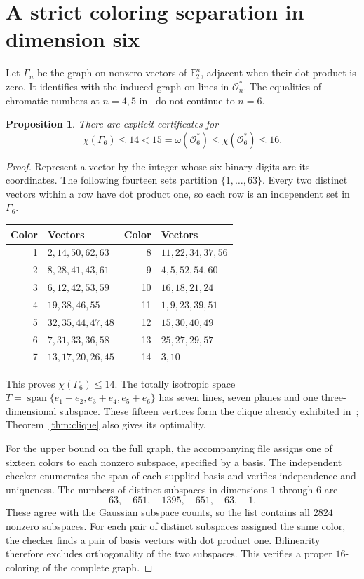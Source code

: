\documentclass[11pt]{article}
\newtheorem{proposition}[theorem]{Proposition}
\newcommand{\F}{\mathbb F_2}
\newcommand{\Oc}{\mathcal O}
\begin{document}
\section{A strict coloring separation in dimension six}

Let $\Gamma_n$ be the graph on nonzero vectors of $\F^n$, adjacent when
their dot product is zero. It identifies with the induced graph on lines
in $\Oc_n^*$. The equalities of chromatic numbers at $n=4,5$ in~\cite{N}
do not continue to $n=6$.

\begin{proposition}\label{prop:color}
There are explicit certificates for
\[
 \chi(\Gamma_6)\le14<15=\omega(\Oc_6^*)\le\chi(\Oc_6^*)\le16.
\]
\end{proposition}

\begin{proof}
Represent a vector by the integer whose six binary digits are its
coordinates. The following fourteen sets partition $\{1,\ldots,63\}$.
Every two distinct vectors within a row have dot product one, so each
row is an independent set in $\Gamma_6$.
\begin{center}
\begin{tabular}{rl@{\qquad}rl}
\toprule
Color&Vectors&Color&Vectors\\
\midrule
1&$2,14,50,62,63$&8&$11,22,34,37,56$\\
2&$8,28,41,43,61$&9&$4,5,52,54,60$\\
3&$6,12,42,53,59$&10&$16,18,21,24$\\
4&$19,38,46,55$&11&$1,9,23,39,51$\\
5&$32,35,44,47,48$&12&$15,30,40,49$\\
6&$7,31,33,36,58$&13&$25,27,29,57$\\
7&$13,17,20,26,45$&14&$3,10$\\
\bottomrule
\end{tabular}
\end{center}
This proves $\chi(\Gamma_6)\le14$. The totally isotropic space
$T=\operatorname{span}\{e_1+e_2,e_3+e_4,e_5+e_6\}$ has seven lines,
seven planes and one three-dimensional subspace. These fifteen vertices
form the clique already exhibited in~\cite{N}; Theorem~\ref{thm:clique}
also gives its optimality.

For the upper bound on the full graph, the accompanying file
 assigns one of sixteen colors to each
nonzero subspace, specified by a basis. The independent checker enumerates
the span of each supplied basis and verifies independence and uniqueness.
The numbers of distinct subspaces in dimensions $1$ through $6$ are
\[
 63,\quad651,\quad1395,\quad651,\quad63,\quad1.
\]
These agree with the Gaussian subspace counts, so the list contains all
$2824$ nonzero subspaces. For each pair of distinct subspaces assigned
the same color, the checker finds a pair of basis vectors with dot
product one. Bilinearity therefore excludes orthogonality of the two
subspaces. This verifies a proper $16$-coloring of the complete graph.
\end{proof}
\end{document}
